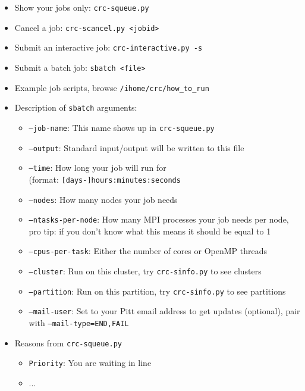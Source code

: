 \documentclass[landscape,a0b,final]{a0poster}
\newcommand{\code}[1]{\texttt{#1}}
\newcommand{\mysection}[1]{
    \begin{center}
        \pbox{0.8\columnwidth}{}{linewidth=3mm,framearc=0.3,linecolor=black,fillstyle=gradient,gradangle=0,gradbegin=white,gradend=white,gradmidpoint=1.0,framesep=0.5em}{
            \begin{center}
                \Large\color{black}{\bf{#1}}
            \end{center}
        }
    \end{center}
    \vspace{0.25cm}
}
\newenvironment{poster}{
  \begin{center}
  \begin{minipage}[c]{0.981\textwidth}
}{
  \end{minipage} 
  \end{center}
}
\newcommand{\pbox}[4]{
\psshadowbox[#3]{
\begin{minipage}[t][#2][t]{#1}
#4
\end{minipage}
}}
\begin{document}
\begin{poster}
\begin{multicols}{3}
    \vspace{0.1cm}
    \mysection{Slurm Jobs}
    \Large    
    \begin{center}
        \begin{itemize}
            \item Show your jobs only: \code{crc-squeue.py}
            \item Cancel a job: \code{crc-scancel.py <jobid>}
            \item Submit an interactive job: \code{crc-interactive.py -s}
            \item Submit a batch job: \code{sbatch <file>}
            \item Example job scripts, browse \code{/ihome/crc/how_to_run}
            \item Description of \code{sbatch} arguments:
            \begin{itemize}
                \item \code{--job-name}: This name shows up in \code{crc-squeue.py}
                \item \code{--output}: Standard input/output will be written to this file
                \item \code{--time}: How long your job will run for \\
                    (format: \code{[days-]hours:minutes:seconds}
                \item \code{--nodes}: How many nodes your job needs
                \item \code{--ntasks-per-node}: How many MPI processes your job
                    needs per node, pro tip: if you don't know what this means
                    it should be equal to 1
                \item \code{--cpus-per-task}: Either the number of cores or OpenMP threads
                \item \code{--cluster}: Run on this cluster, try \code{crc-sinfo.py} to see clusters
                \item \code{--partition}: Run on this partition, try \code{crc-sinfo.py} to see partitions
                \item \code{--mail-user}: Set to your Pitt email address to get updates (optional), pair with \code{--mail-type=END,FAIL}
            \end{itemize}
            \item Reasons from \code{crc-squeue.py}
                \begin{itemize}
                    \item \code{Priority}: You are waiting in line
                    \item ...
                \end{itemize}
        \end{itemize}
    \end{center}


\end{multicols}
\end{poster}
\end{document}
